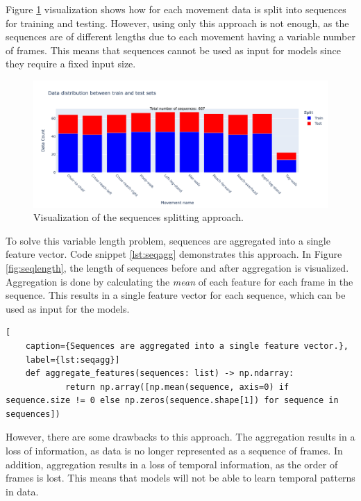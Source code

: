             Figure \ref{fig:seqsplit} visualization shows how for each movement data is split into sequences for training and testing. However, using only this approach is not enough, as the sequences are of different lengths due to each movement having a variable number of frames. This means that sequences cannot be used as input for models since they require a fixed input size. 
        
            \begin{figure}[H]
            \centering
            \includegraphics[width=1.0\textwidth]{../src/resources/plots/splits/seq.png}
            \caption{
                Visualization of the sequences splitting approach.
            }
            \label{fig:seqsplit}
        \end{figure}

        \newpage 

        To solve this variable length problem, sequences are aggregated into a single feature vector. Code snippet \ref{lst:seqagg} demonstrates this approach. In Figure \ref{fig:seqlength}, the length of sequences before and after aggregation is visualized. Aggregation is done by calculating the \textit{mean} of each feature for each frame in the sequence. This results in a single feature vector for each sequence, which can be used as input for the models.

\begin{lstlisting}[
    caption={Sequences are aggregated into a single feature vector.}, 
    label={lst:seqagg}]                
    def aggregate_features(sequences: list) -> np.ndarray:
            return np.array([np.mean(sequence, axis=0) if sequence.size != 0 else np.zeros(sequence.shape[1]) for sequence in sequences])
\end{lstlisting}
        
However, there are some drawbacks to this approach. The aggregation results in a loss of information, as data is no longer represented as a sequence of frames. In addition, aggregation results in a loss of temporal information, as the order of frames is lost. This means that models will not be able to learn temporal patterns in data.

